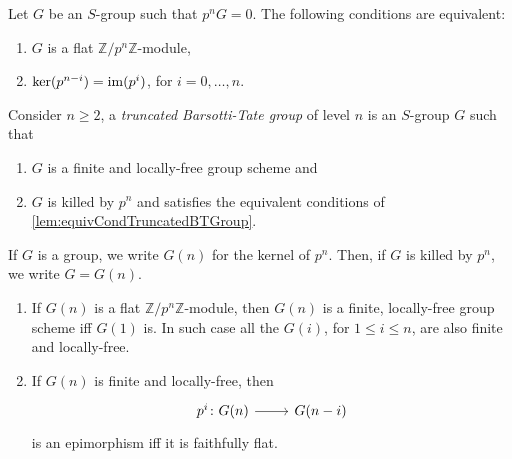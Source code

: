 \begin{lem}\label{lem:equivCondTruncatedBTGroup}
	Let $G$ be an $S$-group such that $p^nG = 0$.
	The following conditions are equivalent:
\begin{enumerate}
	\item $G$ is a flat $\mathbb{Z}/p^n\mathbb{Z}$-module,

	\item $\ker(p^{n-i}) = \operatorname{im} (p^i)$, for $i=0, \ldots, n$.
\end{enumerate}
\end{lem} 


\begin{defn}
	Consider $n \geq 2$, a \emph{truncated Barsotti-Tate group} of level $n$
	is an $S$-group $G$ such that
\begin{enumerate}
	\item $G$ is a finite and locally-free group scheme and
	\item $G$ is killed by $p^n$ and satisfies the equivalent conditions of 
		\cref{lem:equivCondTruncatedBTGroup}.
\end{enumerate}
\end{defn}


\begin{defn}[]
	If $G$ is a group, we write $G(n)$ for the kernel of $p^n$.
	Then, if $G$ is killed by $p^n$, we write $G = G(n)$.
\end{defn}


\begin{lem}\label{FlatnessDescentTrBTGroup}\leavevmode\vspace{-.2\baselineskip}
\begin{enumerate}
	\item If $G(n)$ is a flat $\mathbb{Z}/p^n\mathbb{Z}$-module, then $G(n)$
		is a finite, locally-free group scheme iff
		$G(1)$ is. 
		In such case all the $G(i)$, for $1 \leq i \leq n$, are also finite and locally-free.

	\item If $G(n)$ is finite and locally-free, then
		\begin{equation*}
		\begin{tikzcd}[row sep = 0ex
			,/tikz/column 1/.append style={anchor=base east}
			,/tikz/column 2/.append style={anchor=base west}]
			p^i\colon G(n) \arrow[r, "", rightarrow] &
			G(n-i)
		\end{tikzcd}
		\end{equation*} 
		is an epimorphism iff it is faithfully flat.
\end{enumerate}
\end{lem} 


